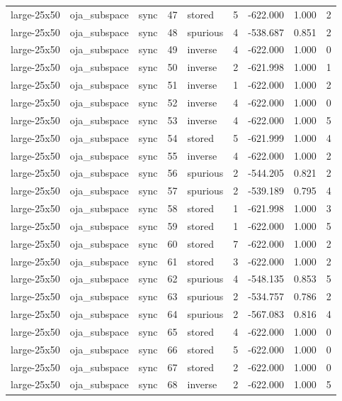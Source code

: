 \begin{tabular}{lllrlrrrr}
large-25x50 & oja\_subspace & sync & 47 & stored & 5 & -622.000 & 1.000 & 2 \\
large-25x50 & oja\_subspace & sync & 48 & spurious & 4 & -538.687 & 0.851 & 2 \\
large-25x50 & oja\_subspace & sync & 49 & inverse & 4 & -622.000 & 1.000 & 0 \\
large-25x50 & oja\_subspace & sync & 50 & inverse & 2 & -621.998 & 1.000 & 1 \\
large-25x50 & oja\_subspace & sync & 51 & inverse & 1 & -622.000 & 1.000 & 2 \\
large-25x50 & oja\_subspace & sync & 52 & inverse & 4 & -622.000 & 1.000 & 0 \\
large-25x50 & oja\_subspace & sync & 53 & inverse & 4 & -622.000 & 1.000 & 5 \\
large-25x50 & oja\_subspace & sync & 54 & stored & 5 & -621.999 & 1.000 & 4 \\
large-25x50 & oja\_subspace & sync & 55 & inverse & 4 & -622.000 & 1.000 & 2 \\
large-25x50 & oja\_subspace & sync & 56 & spurious & 2 & -544.205 & 0.821 & 2 \\
large-25x50 & oja\_subspace & sync & 57 & spurious & 2 & -539.189 & 0.795 & 4 \\
large-25x50 & oja\_subspace & sync & 58 & stored & 1 & -621.998 & 1.000 & 3 \\
large-25x50 & oja\_subspace & sync & 59 & stored & 1 & -622.000 & 1.000 & 5 \\
large-25x50 & oja\_subspace & sync & 60 & stored & 7 & -622.000 & 1.000 & 2 \\
large-25x50 & oja\_subspace & sync & 61 & stored & 3 & -622.000 & 1.000 & 2 \\
large-25x50 & oja\_subspace & sync & 62 & spurious & 4 & -548.135 & 0.853 & 5 \\
large-25x50 & oja\_subspace & sync & 63 & spurious & 2 & -534.757 & 0.786 & 2 \\
large-25x50 & oja\_subspace & sync & 64 & spurious & 2 & -567.083 & 0.816 & 4 \\
large-25x50 & oja\_subspace & sync & 65 & stored & 4 & -622.000 & 1.000 & 0 \\
large-25x50 & oja\_subspace & sync & 66 & stored & 5 & -622.000 & 1.000 & 0 \\
large-25x50 & oja\_subspace & sync & 67 & stored & 2 & -622.000 & 1.000 & 0 \\
large-25x50 & oja\_subspace & sync & 68 & inverse & 2 & -622.000 & 1.000 & 5 \\

\end{tabular}
